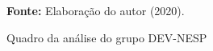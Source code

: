 \begin{figure}[ht!]
\centering

\caption{\textmd{Quadro da análise do grupo DEV-NESP}}
\label{fig:quadro:grupodevnesp}

\par\medskip\textbf{Fonte:} Elaboração do autor (2020). \par\medskip

\end{figure}

